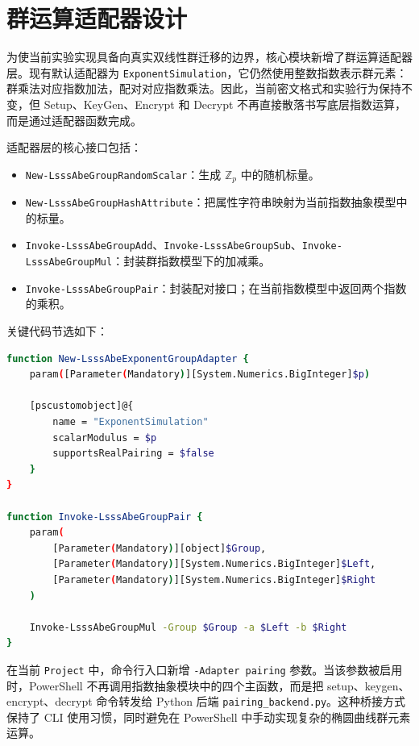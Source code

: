 \section{群运算适配器设计}

为使当前实验实现具备向真实双线性群迁移的边界，核心模块新增了群运算适配器层。现有默认适配器为 \verb|ExponentSimulation|，它仍然使用整数指数表示群元素：群乘法对应指数加法，配对对应指数乘法。因此，当前密文格式和实验行为保持不变，但 Setup、KeyGen、Encrypt 和 Decrypt 不再直接散落书写底层指数运算，而是通过适配器函数完成。

适配器层的核心接口包括：

\begin{itemize}
    \item \verb|New-LsssAbeGroupRandomScalar|：生成 $\mathbb{Z}_p$ 中的随机标量。
    \item \verb|New-LsssAbeGroupHashAttribute|：把属性字符串映射为当前指数抽象模型中的标量。
    \item \verb|Invoke-LsssAbeGroupAdd|、\verb|Invoke-LsssAbeGroupSub|、\verb|Invoke-LsssAbeGroupMul|：封装群指数模型下的加减乘。
    \item \verb|Invoke-LsssAbeGroupPair|：封装配对接口；在当前指数模型中返回两个指数的乘积。
\end{itemize}

关键代码节选如下：

\begin{lstlisting}[language=bash,caption={指数抽象群运算适配器关键代码}]
function New-LsssAbeExponentGroupAdapter {
    param([Parameter(Mandatory)][System.Numerics.BigInteger]$p)

    [pscustomobject]@{
        name = "ExponentSimulation"
        scalarModulus = $p
        supportsRealPairing = $false
    }
}

function Invoke-LsssAbeGroupPair {
    param(
        [Parameter(Mandatory)][object]$Group,
        [Parameter(Mandatory)][System.Numerics.BigInteger]$Left,
        [Parameter(Mandatory)][System.Numerics.BigInteger]$Right
    )

    Invoke-LsssAbeGroupMul -Group $Group -a $Left -b $Right
}
\end{lstlisting}

在当前 \verb|Project| 中，命令行入口新增 \verb|-Adapter pairing| 参数。当该参数被启用时，PowerShell 不再调用指数抽象模块中的四个主函数，而是把 setup、keygen、encrypt、decrypt 命令转发给 Python 后端 \verb|pairing_backend.py|。这种桥接方式保持了 CLI 使用习惯，同时避免在 PowerShell 中手动实现复杂的椭圆曲线群元素运算。

